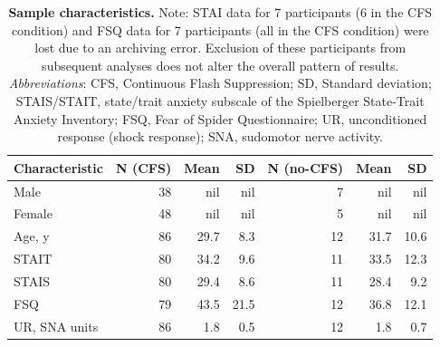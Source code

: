 \documentclass[12pt]{article}
\begin{document}
\clearpage
\singlespacing

\singlespacing
\begin{table}[htbp]
\centering
\begin{tabular}{lrrrrrr}
\textbf{Characteristic} & \textbf{N (CFS)} & \textbf{Mean} & \textbf{SD} & \textbf{N (no-CFS)} & \textbf{Mean} & \textbf{SD}\\
\hline
Male & 38 & nil & nil & 7 & nil & nil\\
Female & 48 & nil & nil & 5 & nil & nil\\
Age, y & 86 & 29.7 & 8.3 & 12 & 31.7 & 10.6\\
STAIT & 80 & 34.2 & 9.6 & 11 & 33.5 & 12.3\\
STAIS & 80 & 29.4 & 8.6 & 11 & 28.4 & 9.2\\
FSQ & 79 & 43.5 & 21.5 & 12 & 36.8 & 12.1\\
UR, SNA units & 86 & 1.8 & 0.5 & 12 & 1.8 & 0.7\\
\end{tabular}
\caption{\label{tab:org270f0e5}
\textbf{Sample characteristics.} Note: STAI data for 7 participants (6 in the CFS condition) and FSQ data for 7 participants (all in the CFS condition) were lost due to an archiving error. Exclusion of these participants from subsequent analyses does not alter the overall pattern of results. \emph{Abbreviations}: CFS, Continuous Flash Suppression; SD, Standard deviation; STAIS/STAIT, state/trait anxiety subscale of the Spielberger State-Trait Anxiety Inventory; FSQ, Fear of Spider Questionnaire; UR, unconditioned response (shock response); SNA, sudomotor nerve activity.}

\end{table}

\clearpage
\end{document}
